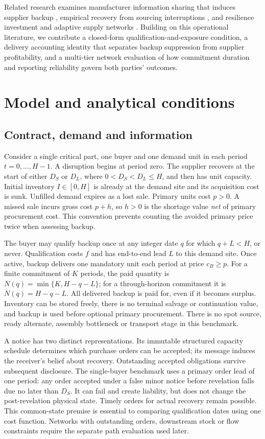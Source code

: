\documentclass[preprint,11pt,authoryear]{elsarticle}
\begin{document}
Related research examines manufacturer information sharing that induces supplier backup \citep{inducingBackup2022}, empirical recovery from sourcing interruptions \citep{jain2022}, and resilience investment and adaptive supply networks \citep{wu2024Investment,hartNibbrig2025Adaptive}. Building on this operational literature, we contribute a closed-form qualification-and-exposure condition, a delivery accounting identity that separates backup suppression from supplier profitability, and a multi-tier network evaluation of how commitment duration and reporting reliability govern both parties' outcomes.

\section{Model and analytical conditions}\label{sec:model}
\subsection{Contract, demand and information}
Consider a single critical part, one buyer and one demand unit in each period $t=0,\ldots,H-1$. A disruption begins at period zero. The supplier recovers at the start of either $D_S$ or $D_L$, where $0<D_S<D_L\le H$, and then has unit capacity. Initial inventory $I\in[0,H]$ is already at the demand site and its acquisition cost is sunk. Unfilled demand expires as a lost sale. Primary units cost $p>0$. A missed sale incurs gross cost $p+h$, so $h>0$ is the shortage value \emph{net} of primary procurement cost. This convention prevents counting the avoided primary price twice when assessing backup.

The buyer may qualify backup once at any integer date $q$ for which $q+L<H$, or never. Qualification costs $f$ and has end-to-end lead $L$ to this demand site. Once active, backup delivers one mandatory unit each period at price $c_B\ge p$. For a finite commitment of $K$ periods, the paid quantity is $N(q)=\min\{K,H-q-L\}$; for a through-horizon commitment it is $N(q)=H-q-L$. All delivered backup is paid for, even if it becomes surplus. Inventory can be stored freely, there is no terminal salvage or continuation value, and backup is used before optional primary procurement. There is no spot source, ready alternate, assembly bottleneck or transport stage in this benchmark.

A notice has two distinct representations. Its immutable structured capacity schedule determines which purchase orders can be accepted; its message induces the receiver's belief about recovery. Outstanding accepted obligations survive subsequent disclosure. The single-buyer benchmark uses a primary order lead of one period: any order accepted under a false minor notice before revelation falls due no later than $D_S$. It can fail and create liability, but does not change the post-revelation physical state. Timely orders for actual recovery remain possible. This common-state premise is essential to comparing qualification dates using one cost function. Networks with outstanding orders, downstream stock or flow constraints require the separate path evaluation used later.
\end{document}
